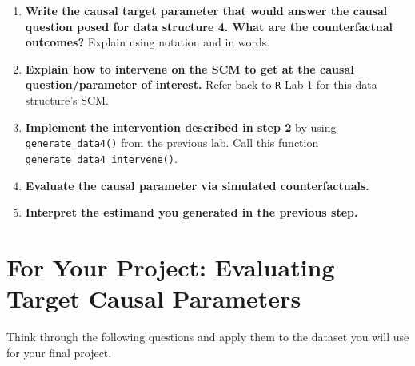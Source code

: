 \documentclass[answers]{exam}
\begin{document}
\begin{enumerate}
\item \textbf{Write the causal target parameter that would answer the causal question posed for data structure 4. What are the counterfactual outcomes?} Explain using notation and in words.
\item \textbf{Explain how to intervene on the SCM to get at the causal question/parameter of interest.} Refer back to \texttt{R} Lab 1 for this data structure's SCM.
\item \textbf{Implement the intervention described in step 2} by using \texttt{generate\_data4()} from the previous lab. Call this function \texttt{generate\_data4\_intervene()}.
\item \textbf{Evaluate the causal parameter via simulated counterfactuals.}
\item \textbf{Interpret the estimand you generated in the previous step.}
\end{enumerate}



\pagebreak

\section{For Your Project: Evaluating Target Causal Parameters}

Think through the following questions and apply them to the dataset you will use for your final project.
\end{document}
